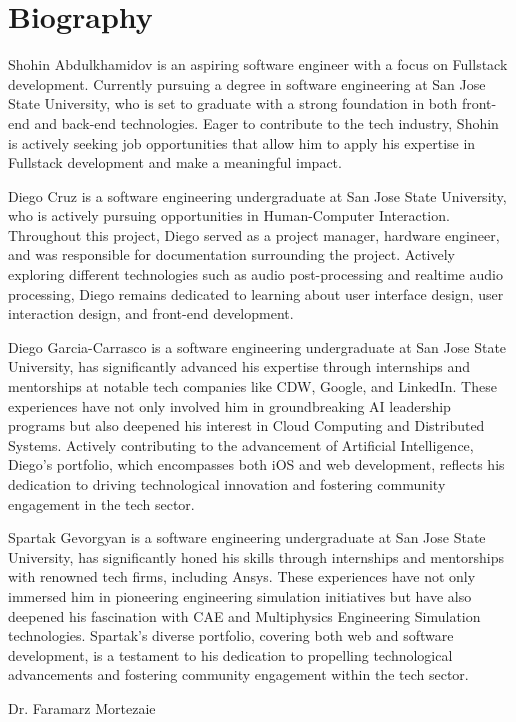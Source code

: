 \cleardoublepage
\section*{Biography}

\begin{IEEEbiographynophoto}{Shohin Abdulkhamidov}
    is an aspiring software engineer with a focus on Fullstack development.
    Currently pursuing a degree in software engineering at San Jose State University, who is set to graduate
    with a strong foundation in both front-end and back-end technologies.
    Eager to contribute to the tech industry, Shohin is actively seeking job opportunities that allow him to
    apply his expertise in Fullstack development and make a meaningful impact.
\end{IEEEbiographynophoto}

\begin{IEEEbiographynophoto}{Diego Cruz}
    is a software engineering undergraduate at San Jose State University, who is actively pursuing opportunities in Human-Computer Interaction.
    Throughout this project, Diego served as a project manager, hardware engineer, and was responsible for documentation surrounding the project.
    Actively exploring different technologies such as audio post-processing and realtime audio processing,
    Diego remains dedicated to learning about user interface design, user interaction design, and front-end development.
\end{IEEEbiographynophoto}

\begin{IEEEbiographynophoto}{Diego Garcia-Carrasco}
    is a software engineering undergraduate at San Jose State University,
    has significantly advanced his expertise through internships and mentorships at notable tech
    companies like CDW, Google, and LinkedIn. These experiences have not only involved him in
    groundbreaking AI leadership programs but also deepened his interest in Cloud Computing and Distributed Systems.
    Actively contributing to the advancement of Artificial Intelligence,
    Diego's portfolio, which encompasses both iOS and web development, reflects his dedication
    to driving technological innovation and fostering community engagement in the tech sector.
\end{IEEEbiographynophoto}

\begin{IEEEbiographynophoto}{Spartak Gevorgyan}
    is a software engineering undergraduate at San Jose State University,
    has significantly honed his skills through internships and mentorships with renowned tech firms, including Ansys.
    These experiences have not only immersed him in pioneering engineering simulation initiatives but have also deepened his fascination with
    CAE and Multiphysics Engineering Simulation technologies.
    Spartak's diverse portfolio, covering both web and software development, is a testament to his dedication to propelling
    technological advancements and fostering community engagement within the tech sector.
\end{IEEEbiographynophoto}

\begin{IEEEbiographynophoto}{Dr. Faramarz Mortezaie}

\end{IEEEbiographynophoto}


\cleardoublepage